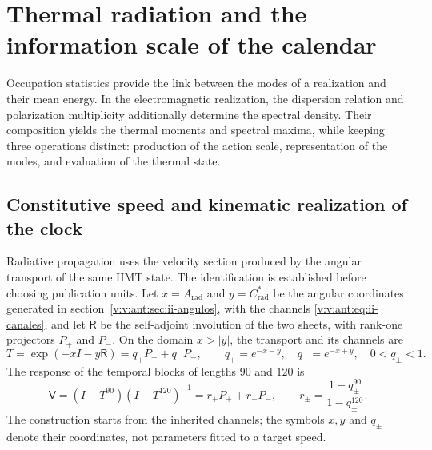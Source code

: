 \section{Thermal radiation and the information scale of the calendar}
\label{v:v:sec:radiacion-termica}

Occupation statistics provide the link between the modes of
a realization and their mean energy. In the electromagnetic realization,
the dispersion relation and polarization multiplicity additionally determine the
spectral density. Their composition yields the thermal moments
and spectral maxima, while keeping three operations distinct:
production of the action scale, representation of the modes, and
evaluation of the thermal state.


\subsection{Constitutive speed and kinematic realization of the clock}
\label{v:v:sec:enlace-velocidad-constitutiva}

Radiative propagation uses the velocity section produced by the
angular transport of the same HMT state. The identification is established
before choosing publication units. Let $x=A_{\mathrm{rad}}$ and
$y=C^*_{\mathrm{rad}}$ be the angular coordinates generated in
section~\ref{v:v:ant:sec:ii-angulos}, with the channels
\eqref{v:v:ant:eq:ii-canales}, and let
$\mathsf R$ be the self-adjoint involution of the two sheets, with rank-one
projectors $P_+$ and $P_-$. On the domain $x>|y|$, the transport and its
channels are
\begin{equation}
 T=\exp(-xI-y\mathsf R)=q_+P_++q_-P_-,
 \qquad q_+=e^{-x-y},\quad q_-=e^{-x+y},\quad 0<q_\pm<1.
 \label{v:v:eq:velocidad-transporte}
\end{equation}
The response of the temporal blocks of lengths $90$ and $120$ is
\begin{equation}
 \mathsf V=(I-T^{90})(I-T^{120})^{-1}
       =r_+P_++r_-P_-,\qquad
 r_\pm=\frac{1-q_\pm^{90}}{1-q_\pm^{120}}.
 \label{v:v:eq:velocidad-respuesta}
\end{equation}
The construction starts from the inherited channels; the symbols $x,y$ and
$q_\pm$ denote their coordinates, not parameters fitted to a target
speed.

